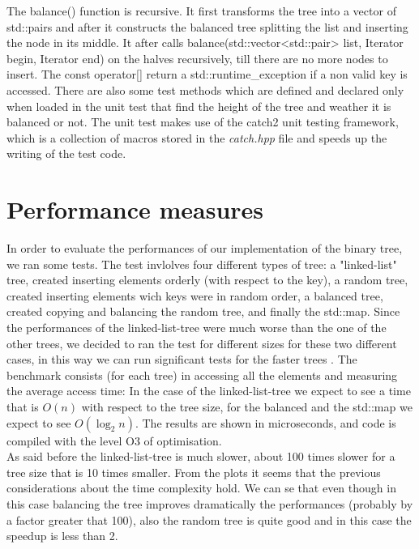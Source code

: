 \documentclass[a4paper,11pt]{article}
\begin{document}
The balance() function is recursive. It first transforms the tree into a vector of std::pairs and after it  constructs the balanced tree splitting the list and inserting the node in its middle. It after calls balance(std::vector<std::pair> list, Iterator begin, Iterator end) on the halves recursively, till there are no more nodes to insert.
The const operator[] return a std::runtime\_exception if a non valid key is accessed.
There are also some test methods which are defined and declared only when loaded in the unit test that find the height of the tree and weather it is balanced or not. 
The unit test makes use of the catch2 unit testing framework, which is a collection of macros stored in the \emph{catch.hpp} file and speeds up the writing of the test code. 

\section*{Performance measures}
In order to evaluate the performances of our implementation of the binary tree, we ran some tests.
The test invlolves four different types of tree: a "linked-list" tree, created inserting elements orderly (with respect to the key), a random tree, created inserting elements wich keys were in random order, a balanced tree, created copying and balancing the random tree, and finally the std::map.
Since the performances of the linked-list-tree were much worse than the one of the other trees, we decided to ran the test for different sizes for these two different cases, in this way we can run significant tests for the faster trees . 
The benchmark consists (for each tree) in accessing all the elements and measuring the average access time:
In the case of the linked-list-tree we expect to see a time that is $O(n)$ with respect to the tree size, for the balanced and the std::map we expect to see $O(\log_2 n)$. 
The results are shown in microseconds, and code is compiled with the level O3 of optimisation.\\



As said before the linked-list-tree is much slower, about 100 times slower for a tree size that is 10 times smaller.
From the plots it seems that the previous considerations about the time complexity hold.
We can se that even though in this case balancing the tree improves dramatically the performances (probably by a factor greater that 100), also the random tree is quite good and in this case the speedup is less than 2.




\vspace{2cm}
\end{document}
